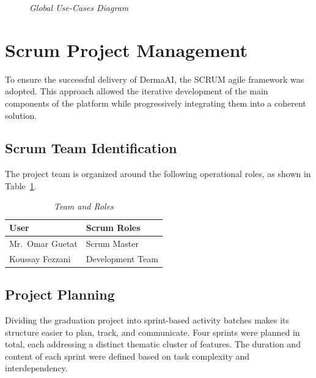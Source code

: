 	\begin{figure}[H]
	  \centering
	  \caption{\textit{Global Use-Cases Diagram}}
	  \label{fig:usecase}
	\end{figure}
	
	\section{Scrum Project Management}
	
	To ensure the successful delivery of DermaAI, the SCRUM agile framework was adopted.
	This approach allowed the iterative development of the main components of the platform while
	progressively integrating them into a coherent solution.
	
	\subsection{Scrum Team Identification}
	
	The project team is organized around the following operational roles,
	as shown in Table~\ref{tab:teamroles}.
	
	\begin{table}[H]
	\centering
	{\setlength{\tabcolsep}{5pt}%
	\renewcommand{\arraystretch}{1.4}%
	\begin{tabular}{|p{7cm}|>{\centering\arraybackslash}p{6cm}|}
	\hline
	\rowcolor[HTML]{1F3864}
	{\color{white}\textbf{User}} & {\color{white}\textbf{Scrum Roles}} \\
	\hline
	Mr.\ Omar Guetat                               & Scrum Master  \\
	\hline
	Koussay Fezzani                              & Development Team \\
	\hline
	\end{tabular}
	}
	\caption{\textit{Team and Roles}}
	\label{tab:teamroles}
	\end{table}
	
	\subsection{Project Planning}
	
	Dividing the graduation project into sprint-based activity batches makes its structure easier to plan, track, and communicate. Four sprints were planned in total, each addressing a distinct thematic cluster of features. The duration and content of each sprint were defined based on task complexity and interdependency.
	
